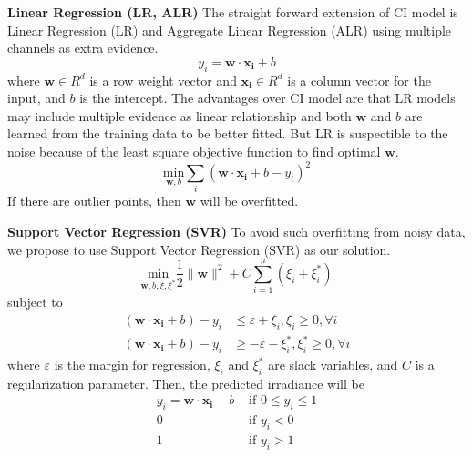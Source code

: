 \documentclass[conference]{IEEEtran}
\begin{document}
\textbf{Linear Regression (LR, ALR)}
The straight forward extension of CI model is Linear Regression (LR) and
Aggregate Linear Regression (ALR) using multiple channels as extra evidence.
\begin{equation}
y_i = \mathbf{w \cdot x_i} + b 
\end{equation}
where $\mathbf{w} \in R^d$ is a row weight vector and $\mathbf{x_i} \in R^d$ is a column vector for the input, 
and $b$ is the intercept. The advantages over CI model are that LR models may
include multiple evidence as linear relationship and both $\mathbf{w}$ and $b$ are learned from the training data to be better fitted.
But LR is suspectible to the noise because of the least square objective function
to find optimal $\mathbf{w}$.
\begin{equation}
 \underset{\mathbf{w},b}{\text{min}} \sum_i{(\mathbf{w}\cdot \mathbf{x_i} + b - y_i)^2 } 
\end{equation}
If there are outlier points, then $\mathbf{w}$ will be overfitted.

\textbf{Support Vector Regression (SVR)}
To avoid such overfitting from noisy data, we propose to use Support Vector Regression (SVR) as our solution.
\begin{equation}
 \underset{\mathbf{w},b,\xi,\xi^*}{\text{min}} \frac{1}{2}\|\mathbf{w}\|^2  + C {\sum_{i=1}^{n}\left(\xi_i + \xi_i^{*}\right)}
\label{pm:svr}
\end{equation}
subject to 
\begin{equation}
\begin{aligned}
(\mathbf{w \cdot x_i} + b) - y_i &\le \varepsilon + \xi_i, \xi_i \ge 0 , \forall i\\
(\mathbf{w \cdot x_i} + b) - y_i &\ge - \varepsilon - \xi_i^{*}, \xi_i^{*} \ge 0 , \forall i
\end{aligned}
\label{pm:svrc}
\end{equation}
where $\varepsilon$ is the margin for regression, $\xi_i$ and $\xi_i^{*}$ are slack variables, and $C$ is a regularization parameter. 
Then, the predicted irradiance will be 
\begin{equation}
\begin{aligned}
y_i = \mathbf{w \cdot x_i} + b & \text{ if } 0 \le y_i \le 1\\
0 & \text{ if } y_i < 0 \\
1 & \text{ if } y_i > 1 
\end{aligned}
\end{equation}
\end{document}
